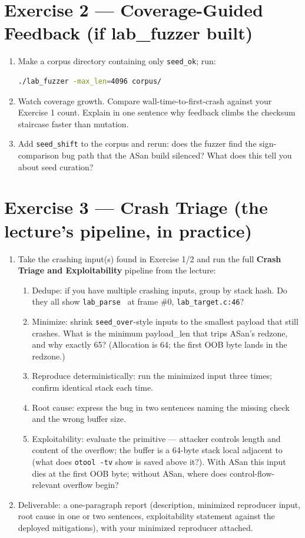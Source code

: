 \documentclass[12pt]{Training}
\begin{document}
\section*{Exercise 2 --- Coverage-Guided Feedback (if lab\_fuzzer built)}
\begin{enumerate}
    \item Make a corpus directory containing only \lstinline{seed_ok}; run:
    \begin{lstlisting}[language=bash]
./lab_fuzzer -max_len=4096 corpus/
    \end{lstlisting}
    \item Watch coverage growth. Compare wall-time-to-first-crash against your Exercise 1 count. Explain in one sentence why feedback climbs the checksum staircase faster than mutation.
    \item Add \lstinline{seed_shift} to the corpus and rerun: does the fuzzer find the sign-comparison bug path that the ASan build silenced? What does this tell you about seed curation?
\end{enumerate}

\section*{Exercise 3 --- Crash Triage (the lecture's pipeline, in practice)}
\begin{enumerate}
    \item Take the crashing input(s) found in Exercise 1/2 and run the full \textbf{Crash Triage and Exploitability} pipeline from the lecture:
    \begin{enumerate}
        \item Dedupe: if you have multiple crashing inputs, group by stack hash. Do they all show \lstinline{lab_parse } at frame \#0, \lstinline{lab_target.c:46}?
        \item Minimize: shrink \lstinline{seed_over}-style inputs to the smallest payload that still crashes. What is the minimum payload\_len that trips ASan's redzone, and why exactly 65? (Allocation is 64; the first OOB byte lands in the redzone.)
        \item Reproduce deterministically: run the minimized input three times; confirm identical stack each time.
        \item Root cause: express the bug in two sentences naming the missing check and the wrong buffer size.
        \item Exploitability: evaluate the primitive --- attacker controls length and content of the overflow; the buffer is a 64-byte stack local adjacent to (what does \lstinline{otool -tv} show is saved above it?). With ASan this input dies at the first OOB byte; without ASan, where does control-flow-relevant overflow begin?
    \end{enumerate}
    \item Deliverable: a one-paragraph report (description, minimized reproducer input, root cause in one or two sentences, exploitability statement against the deployed mitigations), with your minimized reproducer attached.
\end{enumerate}
\end{document}
